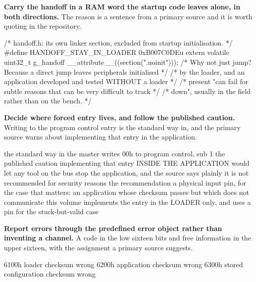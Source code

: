 \begin{steps}
\item \textbf{Carry the handoff in a RAM word the startup code leaves alone, in
both directions.} The reason is a sentence from a primary source and it is worth
quoting in the repository.
\begin{ccode}
/* handoff.h: its own linker section, excluded from startup initialisation. */
#define HANDOFF_STAY_IN_LOADER   0xB007C0DEu
extern volatile uint32_t g_handoff __attribute__((section(".noinit")));
/* Why not just jump? Because a direct jump leaves peripherals initialised  */
/* by the loader, and an application developed and tested WITHOUT a loader  */
/* present "can fail for subtle reasons that can be very difficult to track */
/* down", usually in the field rather than on the bench.                    */
\end{ccode}

\item \textbf{Decide where forced entry lives, and follow the published
caution.} Writing to the program control entry is the standard way in, and the
primary source warns about implementing that entry in the application.
\begin{plaincode}
the standard way in    the master writes 00h to program control, sub 1
the published caution  implementing that entry INSIDE THE APPLICATION would
                       let any tool on the bus stop the application, and the
                       source says plainly it is not recommended for
                       security reasons
the recommendation     a physical input pin, for the case that matters: an
                       application whose checksum passes but which does not
                       communicate
this volume            implements the entry in the LOADER only, and uses a
                       pin for the stuck-but-valid case
\end{plaincode}

\item \textbf{Report errors through the predefined error object rather than
inventing a channel.} A code in the low sixteen bits and free information in the
upper sixteen, with the assignment a primary source suggests.
\begin{plaincode}
6100h   loader checksum wrong
6200h   application checksum wrong
6300h   stored configuration checksum wrong
\end{plaincode}


\end{steps}
